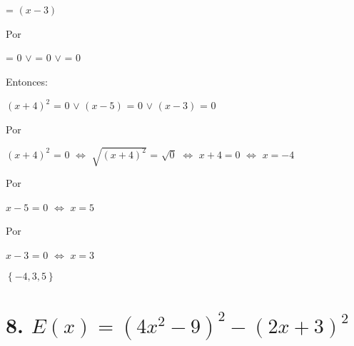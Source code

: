 \documentclass[12pt]{article}
\begin{document}
\begin{center}
    {} = $(x-3)$   
\end{center}
Por {}
\begin{center}
   {} = $0$  $\vee$ {} = $0$  $\vee$ {} = $0$ 
\end{center}

Entonces:

\begin{center}
   
   $(x+4)^{2}$ = $0$  $\vee$ $(x-5)$ = $0$ $\vee$ $(x-3)$ = $0$
   
\end{center}

Por {}

\begin{center}
   
   $(x+4)^{2}$  = $0$ $\Leftrightarrow$  $\sqrt{(x+4)^{2}}$  = $\sqrt{0}$ $\Leftrightarrow$ $ x+4=0 $  $\Leftrightarrow$ $x=-4$
   
\end{center}

Por {}

\begin{center}
   
  $x-5$ = $0$  $\Leftrightarrow$ $ x= 5$ 
   
\end{center}

Por {}

\begin{center}
   
   $x-3$  = $0$ $\Leftrightarrow$ $ x=3 $ 
   
\end{center}

{}

\begin{center}
   
  $\left\{-4,3,5\right\}$ 
   
\end{center}

\newpage

\section*{8. $E(x) = (4x^{2} - 9)^{2} - (2x+3)^{2}$}

{}
\end{document}

